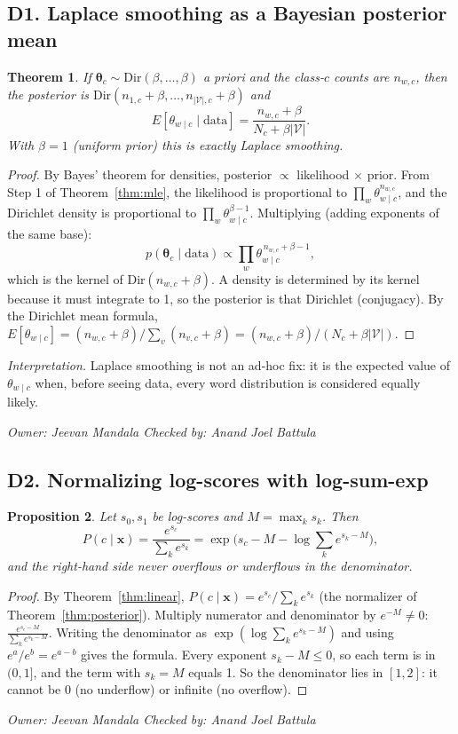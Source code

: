 \documentclass[11pt]{article}
\newcommand{\owner}[2]{\par\noindent\textit{Owner: #1 \hfill Checked by: #2}\par\medskip}
\theoremstyle{plain}
\newtheorem{theorem}{Theorem}
\newtheorem{proposition}[theorem]{Proposition}
\theoremstyle{definition}
\newcommand{\Vs}{|\mathcal{V}|}
\newcommand{\bx}{\mathbf{x}}
\begin{document}
\subsection{D1. Laplace smoothing as a Bayesian posterior mean}\label{sec:dirichlet}
\begin{theorem}\label{thm:dirichlet}
If $\boldsymbol\theta_c\sim\mathrm{Dir}(\beta,\dots,\beta)$ a priori and the class-$c$ counts are
$n_{w,c}$, then the posterior is $\mathrm{Dir}(n_{1,c}+\beta,\dots,n_{\Vs,c}+\beta)$ and
\[
E[\theta_{w\mid c}\mid\text{data}]=\frac{n_{w,c}+\beta}{N_c+\beta\Vs}.
\]
With $\beta=1$ (uniform prior) this is exactly Laplace smoothing.
\end{theorem}
\begin{proof}
By Bayes' theorem for densities, posterior $\propto$ likelihood $\times$ prior. From Step 1 of
Theorem~\ref{thm:mle}, the likelihood is proportional to $\prod_w\theta_{w\mid c}^{n_{w,c}}$, and
the Dirichlet density is proportional to $\prod_w\theta_{w\mid c}^{\beta-1}$. Multiplying
(adding exponents of the same base):
\[
p(\boldsymbol\theta_c\mid\text{data})\propto\prod_w\theta_{w\mid c}^{\,n_{w,c}+\beta-1},
\]
which is the kernel of $\mathrm{Dir}(n_{w,c}+\beta)$. A density is determined by its kernel
because it must integrate to 1, so the posterior is that Dirichlet (conjugacy). By the Dirichlet
mean formula, $E[\theta_{w\mid c}]=(n_{w,c}+\beta)/\sum_v(n_{v,c}+\beta)=(n_{w,c}+\beta)/(N_c+\beta\Vs)$.
\end{proof}
\noindent\emph{Interpretation.} Laplace smoothing is not an ad-hoc fix: it is the expected value of
$\theta_{w\mid c}$ when, before seeing data, every word distribution is considered equally likely.
\owner{Jeevan Mandala}{Anand Joel Battula}

\subsection{D2. Normalizing log-scores with log-sum-exp}\label{sec:lse}
\begin{proposition}\label{prop:lse}
Let $s_0,s_1$ be log-scores and $M=\max_k s_k$. Then
\[
P(c\mid\bx)=\frac{e^{s_c}}{\sum_ke^{s_k}}=\exp\!\Big(s_c-M-\log\sum_ke^{s_k-M}\Big),
\]
and the right-hand side never overflows or underflows in the denominator.
\end{proposition}
\begin{proof}
By Theorem~\ref{thm:linear}, $P(c\mid\bx)=e^{s_c}/\sum_ke^{s_k}$ (the normalizer of
Theorem~\ref{thm:posterior}). Multiply numerator and denominator by $e^{-M}\ne0$:
$\frac{e^{s_c-M}}{\sum_ke^{s_k-M}}$. Writing the denominator as $\exp(\log\sum_ke^{s_k-M})$
and using $e^a/e^b=e^{a-b}$ gives the formula. Every exponent $s_k-M\le0$, so each term is
in $(0,1]$, and the term with $s_k=M$ equals 1. So the denominator lies in $[1,2]$: it cannot
be 0 (no underflow) or infinite (no overflow).
\end{proof}
\owner{Jeevan Mandala}{Anand Joel Battula}
\end{document}
